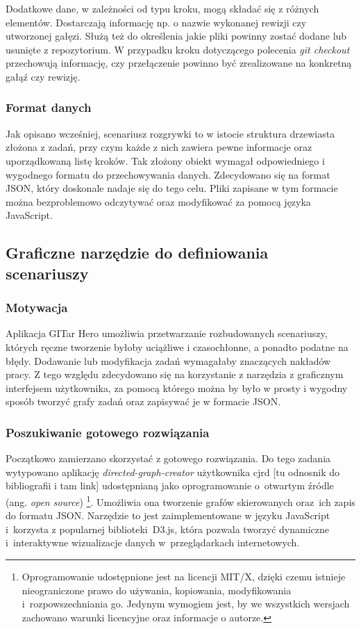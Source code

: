 \documentclass[11pt,a4paper,polish,thesis]{dcsbook}
\begin{document}
	Dodatkowe dane, w zależności od typu kroku, mogą składać się z różnych elementów. Dostarczają informację np. o nazwie wykonanej rewizji czy utworzonej gałęzi. Służą też do określenia jakie pliki powinny zostać dodane lub usunięte z repozytorium. W przypadku kroku dotyczącego polecenia \textit{git checkout} przechowują informację, czy przełączenie powinno być zrealizowane na konkretną gałąź czy rewizję.
	
	\subsubsection{Format danych}
	
	Jak opisano wcześniej, scenariusz rozgrywki to w istocie struktura drzewiasta złożona z zadań, przy czym każde z nich zawiera pewne informacje oraz uporządkowaną listę kroków. Tak złożony obiekt wymagał odpowiedniego i wygodnego formatu do przechowywania danych. Zdecydowano się na format JSON, który doskonale nadaje się do tego celu. Pliki zapisane w tym formacie można bezproblemowo odczytywać oraz modyfikować za pomocą języka JavaScript.
	
	\subsection{Graficzne narzędzie do definiowania scenariuszy}
	
	\subsubsection{Motywacja}
	
	Aplikacja GITar Hero umożliwia przetwarzanie rozbudowanych scenariuszy, których ręczne tworzenie byłoby uciążliwe i  czasochłonne, a ponadto podatne na błędy. Dodawanie lub modyfikacja zadań wymagałaby znaczących nakładów pracy.
	Z tego względu zdecydowano się na korzystanie z narzędzia z graficznym interfejsem użytkownika, za pomocą którego można by było w prosty i wygodny sposób tworzyć grafy zadań oraz zapisywać je w formacie JSON. 
	
	\subsubsection{Poszukiwanie gotowego rozwiązania}
	
	Początkowo zamierzano skorzystać z gotowego rozwiązania. Do tego zadania wytypowano aplikację \textit{directed-graph-creator} użytkownika cjrd [tu odnosnik do bibliografii i tam link] udostępnianą jako oprogramowanie o~otwartym źródle (ang. \textit{open source}) \footnote{Oprogramowanie udostępnione jest na licencji MIT/X, dzięki czemu istnieje nieograniczone prawo do używania, kopiowania, modyfikowania i~rozpowszechniania go. Jedynym wymogiem jest, by we wszystkich wersjach zachowano warunki licencyjne oraz informacje o autorze.}. Umożliwia ona tworzenie grafów skierowanych oraz~ich zapis do formatu JSON. Narzędzie to jest zaimplementowane w języku JavaScript i~korzysta z popularnej biblioteki~D3.js, która pozwala tworzyć dynamiczne i~interaktywne wizualizacje danych w~przeglądarkach internetowych.
	
\end{document}

